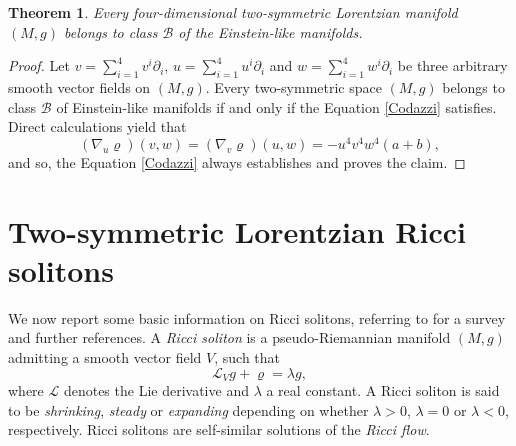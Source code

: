 \documentclass[11pt,oneside,leqno]{amsart}
\theoremstyle{plain}
\newtheorem{theorem}{Theorem}[section]
\begin{document}
\vspace{.3cm}
\begin{theorem}
Every four-dimensional two-symmetric Lorentzian manifold $(M,g)$ belongs to class ${\mathcal B}$ of the Einstein-like manifolds.
\end{theorem}
\begin{proof}
Let $v=\sum_{i=1}^4 v^i{\partial}_i$, $u=\sum_{i=1}^4 u^i{\partial}_i$ and $w=\sum_{i=1}^4w^i{\partial}_i$ be three arbitrary smooth vector fields on $(M,g)$. Every  two-symmetric space $(M,g)$ belongs to class ${\mathcal B}$ of Einstein-like manifolds if and only if the Equation \eqref{Codazzi} satisfies. Direct calculations yield that
$$
(\nabla_u\varrho)(v,w)=(\nabla_v\varrho)(u,w)=-u^4v^4w^4(a+b),
$$
and so, the Equation \eqref{Codazzi} always establishes and proves the claim.
\end{proof}
\section{Two-symmetric Lorentzian Ricci solitons}
We now report some basic information on Ricci solitons, referring to \cite{Cao} for a survey and further references. A \emph{Ricci soliton} is a pseudo-Riemannian manifold $(M,g)$  admitting a smooth vector field $V$, such that
\begin{equation}\label{soliton}
\mathcal{L}_V g+\varrho=\lambda g,
\end{equation}
where $\mathcal{L}$ denotes the Lie derivative and $\lambda$ a real constant.
A Ricci soliton is said to be \emph{shrinking}, \emph{steady} or
\emph{expanding} depending on whether $\lambda>0$, $\lambda=0$ or $\lambda<0$, respectively. Ricci solitons are  self-similar solutions of the \emph{Ricci flow}.
\end{document}
